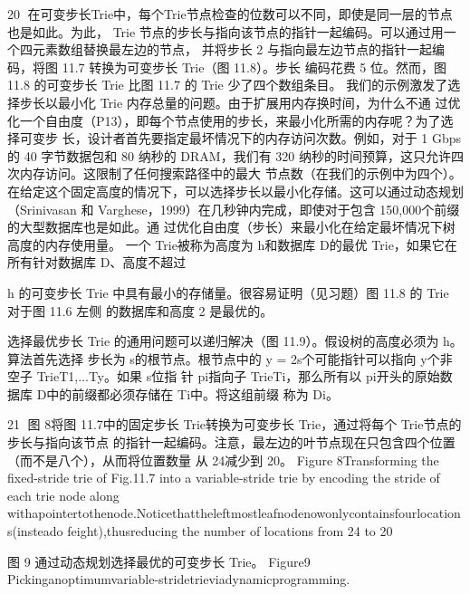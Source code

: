                                                                                          20
在可变步长Trie中，每个Trie节点检查的位数可以不同，即使是同一层的节点也是如此。为此，
Trie 节点的步长与指向该节点的指针一起编码。可以通过用一个四元素数组替换最左边的节点，
并将步长 2 与指向最左边节点的指针一起编码，将图 11.7 转换为可变步长 Trie（图 11.8）。步长
编码花费 5 位。然而，图 11.8 的可变步长 Trie 比图 11.7 的 Trie 少了四个数组条目。
我们的示例激发了选择步长以最小化 Trie 内存总量的问题。由于扩展用内存换时间，为什么不通
过优化一个自由度（P13），即每个节点使用的步长，来最小化所需的内存呢？为了选择可变步
长，设计者首先要指定最坏情况下的内存访问次数。例如，对于 1 Gbps 的 40 字节数据包和 80
纳秒的
DRAM，我们有 320 纳秒的时间预算，这只允许四次内存访问。这限制了任何搜索路径中的最大
节点数（在我们的示例中为四个）。
在给定这个固定高度的情况下，可以选择步长以最小化存储。这可以通过动态规划（Srinivasan
和 Varghese，1999）在几秒钟内完成，即使对于包含 150,000个前缀的大型数据库也是如此。通
过优化自由度（步长）来最小化在给定最坏情况下树高度的内存使用量。
一个 Trie被称为高度为 h和数据库 D的最优 Trie，如果它在所有针对数据库 D、高度不超过



h 的可变步长 Trie 中具有最小的存储量。很容易证明（见习题）图 11.8 的 Trie 对于图 11.6 左侧
的数据库和高度 2 是最优的。


选择最优步长 Trie 的通用问题可以递归解决（图 11.9）。假设树的高度必须为 h。算法首先选择
步长为 s的根节点。根节点中的 y = 2s个可能指针可以指向 y个非空子 TrieT1,...Ty。如果 s位指
针 pi指向子 TrieTi，那么所有以 pi开头的原始数据库 D中的前缀都必须存储在 Ti中。将这组前缀
称为 Di。




                                                         21
图 8将图 11.7中的固定步长 Trie转换为可变步长 Trie，通过将每个 Trie节点的步长与指向该节点
的指针一起编码。注意，最左边的叶节点现在只包含四个位置（而不是八个），从而将位置数量
从 24减少到 20。
Figure 8Transforming the fixed-stride trie of Fig.11.7 into a variable-stride trie by encoding
the           stride         of           each             trie          node            along
withapointertothenode.Noticethattheleftmostleafnodenowonlycontainsfourlocations(insteado
feight),thusreducing the number of locations from 24 to 20




                       图 9 通过动态规划选择最优的可变步长 Trie。
           Figure9 Pickinganoptimumvariable-stridetrieviadynamicprogramming.

